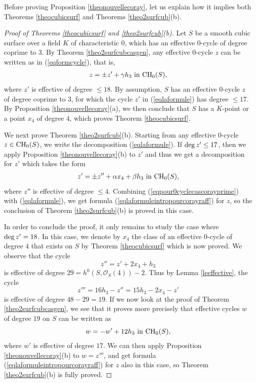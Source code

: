 \documentclass[10pt]{article}
\begin{document}
Before proving Proposition \ref{theonouvellecoray}, let us explain how it implies both Theorems \ref{theocubicsurf} and Theorems \ref{theo2surfcub}(b).
\begin{proof}[Proof of Theorems \ref{theocubicsurf} and  \ref{theo2surfcub}(b)] Let $S$ be a smooth cubic surface over a field $K$ of characteristic $0$, which has an effective $0$-cycle of degree   coprime to $3$.  By Theorem \ref{theo2surfcubcasgen}, any effective $0$-cycle $z$ can be written as in (\ref{eqformcycle}), that is,
\begin{eqnarray}\label{eqlaformule} z=\pm z'+\gamma h_3\,\,{\rm in}\,\,{\rm CH}_0(S),\end{eqnarray}
 where $z'$ is effective of degree $\leq 18$. By assumption, $S$ has an effective $0$-cycle $z$ of degree coprime to $3$, for which  the cycle $z'$ in  (\ref{eqlaformule}) has degree $\leq 17$. By Proposition \ref{theonouvellecoray}(a), we then conclude that $S$ has a $K$-point or a point $x_4$ of degree $4$, which proves Theorem \ref{theocubicsurf}.

We next prove  Theorem \ref{theo2surfcub}(b). Starting from any effective $0$-cycle $z\in {\rm CH}_0(S)$, we write the decomposition (\ref{eqlaformule}). If
 ${\rm deg}\,z'\leq 17$, then we apply Proposition \ref{theonouvellecoray}(b) to $z'$ and thus we get a decomposition for $z'$  which takes the form
 \begin{eqnarray}\label{eqpour0cyclecascorayprime} z'=\pm z''+\alpha x_4+\beta h_3\,\,{\rm in}\,\,{\rm CH}_0(S),
\end{eqnarray}
where $z''$ is effective of degree $\leq 4$. Combining (\ref{eqpour0cyclecascorayprime}) with (\ref{eqlaformule}), we get  formula (\ref{eqlaformuleintropourcorayraff}) for $z$, so the conclusion of Theorem \ref{theo2surfcub}(b) is proved in this case.

In order to conclude the proof, it only remains to study the case where ${\rm deg}\,z'=18$. In this case, we denote by $x_4$  the class of an effective $0$-cycle of degree $4$ that exists on $S$ by Theorem \ref{theocubicsurf} which is now proved.
We observe that the cycle
$$z''=z'+2x_4+h_3$$
is effective of degree $29=h^0(S,\mathcal{O}_S(4))-2$. Thus by Lemma \ref{leeffective}, the cycle
$$z'''=16h_3-z''=15h_3-2x_4-z'$$
is effective of degree $48-29=19$. If we now look at the proof of Theorem  \ref{theo2surfcubcasgen}, we see that it proves more precisely that effective cycles $w$ of degree $19$ on $S$ can be written as
$$w=-w'+12 h_3\,\,{\rm in}\,\,{\rm CH}_0(S),$$
where $w'$ is effective of degree $17$. We can then  apply Proposition \ref{theonouvellecoray}(b) to $w=z'''$, and get formula (\ref{eqlaformuleintropourcorayraff}) for $z$ also in this case, so Theorem  \ref{theo2surfcub}(b) is fully proved.
\end{proof}
\end{document}
